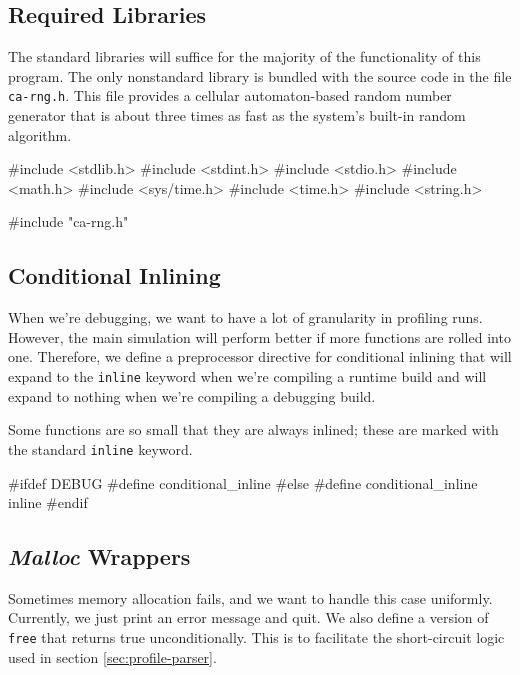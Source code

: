 \documentclass{article}
\begin{document}
    \subsection{Required Libraries}
      \label{sec:libraries}

      The standard libraries will suffice for the majority of the functionality
      of this program. The only nonstandard library is bundled with the source
      code in the file \verb|ca-rng.h|. This file provides a cellular
      automaton-based random number generator that is about three times as fast
      as the system's built-in random algorithm.

\begin{ccode}
#include <stdlib.h>
#include <stdint.h>
#include <stdio.h>
#include <math.h>
#include <sys/time.h>
#include <time.h>
#include <string.h>

#include "ca-rng.h"
\end{ccode}

    \subsection{Conditional Inlining}
      \label{sec:inlining}

      When we're debugging, we want to have a lot of granularity in profiling
      runs. However, the main simulation will perform better if more functions
      are rolled into one. Therefore, we define a preprocessor directive for
      conditional inlining that will expand to the \verb|inline| keyword when
      we're compiling a runtime build and will expand to nothing when we're
      compiling a debugging build.

      Some functions are so small that they are always inlined; these are marked
      with the standard \verb|inline| keyword.

\begin{ccode}
#ifdef DEBUG
  #define conditional_inline
#else
  #define conditional_inline inline
#endif
\end{ccode}

    \subsection{{\em Malloc} Wrappers}
      \label{sec:malloc}

      Sometimes memory allocation fails, and we want to handle this case
      uniformly. Currently, we just print an error message and quit. We also
      define a version of \verb|free| that returns true unconditionally. This is
      to facilitate the short-circuit logic used in section
      \ref{sec:profile-parser}.
\end{document}
